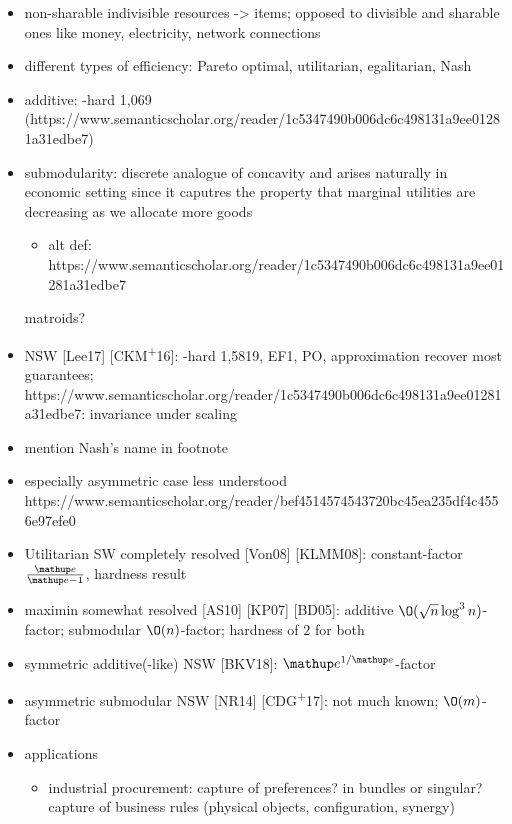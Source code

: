 \begin{itemize}
	\item
	non-sharable indivisible resources -> items; opposed to divisible and sharable ones like money, electricity, network connections

	\item
	different types of efficiency: Pareto optimal, utilitarian, egalitarian, Nash

	\item
	additive:
	\NP-hard 1,069 (https://www.semanticscholar.org/reader/1c5347490b006dc6c498131a9ee01281a31edbe7)

	\item
	submodularity:
	discrete analogue of concavity and arises naturally in economic setting since it caputres the property that marginal utilities are decreasing as we allocate more goods
	\begin{itemize}
		\item
		alt def: https://www.semanticscholar.org/reader/1c5347490b006dc6c498131a9ee01281a31edbe7
	\end{itemize}
	matroids?

	\item
	NSW [Lee17] [CKM\textsuperscript{+}16]:
	\NP-hard 1,5819, EF1, PO, approximation recover most guarantees;
	https://www.semanticscholar.org/reader/1c5347490b006dc6c498131a9ee01281a31edbe7:
	invariance under scaling

	\item
	mention Nash's name in footnote

	\item
	especially asymmetric case less understood
	https://www.semanticscholar.org/reader/bef4514574543720bc45ea235df4c4556e97efe0

	\item
	Utilitarian SW completely resolved [Von08] [KLMM08]:
	constant-factor \(\frac{\euler}{\euler - 1}\), hardness result

	\item
	maximin somewhat resolved [AS10] [KP07] [BD05]:
	additive \(\O(\sqrt{n} \log^3 n)\)-factor;
	submodular \(\O(n)\)-factor;
	hardness of \(2\) for both

	\item
	symmetric additive(-like) NSW [BKV18]:
	\(\euler^{1/\euler}\)-factor

	\item
	asymmetric submodular NSW [NR14] [CDG\textsuperscript{+}17]:
	not much known;
	\(\O(m)\)-factor

	\item
	applications
	\begin{itemize}
		\item
		industrial procurement:
		capture of preferences?
		in bundles or singular?
		capture of business rules (physical objects, configuration, synergy)
		\cite{survey}


\end{itemize}
\end{itemize}
